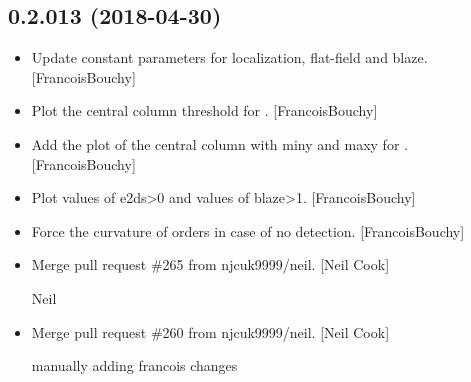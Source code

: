 \documentclass[a4paper,10pt,english]{report}
\begin{document}
\subsection{0.2.013 (2018-04-30)}
\label{\detokenize{misc/changelog:id449}}\begin{itemize}
\item {} 
Update constant parameters for localization, flat-field and blaze.
{[}FrancoisBouchy{]}

\item {} 
Plot the central column threshold for . {[}FrancoisBouchy{]}

\item {} 
Add the plot of the central column with miny and maxy for .
{[}FrancoisBouchy{]}

\item {} 
Plot values of e2ds\textgreater{}0 and values of blaze\textgreater{}1. {[}FrancoisBouchy{]}

\item {} 
Force the curvature of orders in case of no detection.
{[}FrancoisBouchy{]}

\item {} 
Merge pull request \#265 from njcuk9999/neil. {[}Neil Cook{]}

Neil

\item {} 
Merge pull request \#260 from njcuk9999/neil. {[}Neil Cook{]}

manually adding francois changes

\end{itemize}
\end{document}
